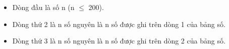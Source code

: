 \begin{itemize}
	\item Dòng đầu là số n (n $\le$  200).
	\item Dòng thứ 2 là n số nguyên là n số được ghi trên dòng 1 của bảng số.
	\item Dòng thứ 3 là n số nguyên là n số được ghi trên dòng 2 của bảng số.
\end{itemize}